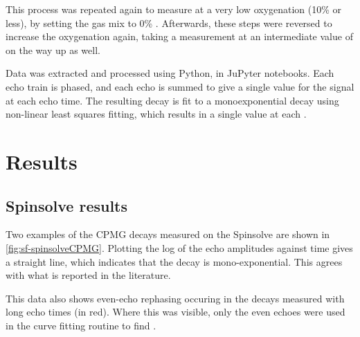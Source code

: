 This process was repeated again to measure \Ttwo at a very low oxygenation (10\% or less), by setting the gas mix to 0\% \Otwo.
Afterwards, these steps were reversed to increase the oxygenation again, taking a measurement at an intermediate value of \SOtwo on the way up as well.

Data was extracted and processed using Python, in JuPyter notebooks.
Each echo train is phased, and each echo is summed to give a single value for the signal at each echo time.
The resulting decay is fit to a monoexponential decay using non-linear least squares fitting, which results in a single \Ttwo value at each \SOtwo.

\section{Results}
\subsection{Spinsolve results}
Two examples of the CPMG decays measured on the Spinsolve are shown in \autoref{fig:sf-spinsolveCPMG}.
Plotting the log of the echo amplitudes against time gives a straight line, which indicates that the decay is mono-exponential.
This agrees with what is reported in the literature.

This data also shows even-echo rephasing occuring in the decays measured with long echo times (in red).
Where this was visible, only the even echoes were used in the curve fitting routine to find \Ttwo.

